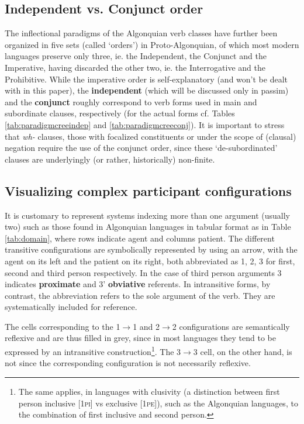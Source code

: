 \documentclass[twoside,a4paper,11pt]{article}
\newcommand{\Σ}{\greek{Σ}}
\newcommand{\pli}{\textsc{pi}}
\newcommand{\pe}{\textsc{pe}}
\begin{document}
\subsection{Independent vs. Conjunct order}
The inflectional paradigms of the Algonquian verb classes have further been organized in five sets (called `orders') in Proto-Algonquian, of which most modern languages preserve only three, ie. the Independent, the Conjunct and the Imperative, having discarded the other two, ie. the Interrogative and the Prohibitive. While the imperative order is self-explanatory (and won't be dealt with in this paper), the \textbf{independent} (which will be discussed only in passim) and the \textbf{conjunct} roughly correspond to verb forms used in main and subordinate clauses, respectively (for the actual forms cf. Tables \ref{tab:paradigmcreeindep} and \ref{tab:paradigmcreeconj}). It is important to stress that \textit{wh-} clauses, those with focalized constituents or under the scope of (clausal) negation require the use of the conjunct order, since these `de-subordinated' clauses are underlyingly (or rather, historically) non-finite.

\subsection{Visualizing complex participant configurations}
\label{subsec:visual}
It is customary to represent systems indexing more than one argument (usually two) such as those found in Algonquian languages in tabular format as in Table \ref{tab:domain}, where rows indicate agent and columns patient. The different transitive configurations are symbolically represented by using an arrow, with the agent on its left and the patient on its right, both abbreviated as 1, 2, 3 for first, second and third person respectively. In the case of third person arguments 3 indicates \textbf{proximate} and 3' \textbf{obviative} referents. In intransitive forms, by contrast, the abbreviation refers to the sole argument of the verb. They are systematically included for reference.

The cells corresponding to the 1$\rightarrow$1 and 2$\rightarrow$2 configurations are semantically reflexive and are thus filled in grey, since in most languages they tend to be expressed by an intransitive construction\footnote{The same applies, in languages with clusivity (a distinction between first person inclusive [1\pli] vs exclusive [1\pe]), such as the Algonquian languages, to the combination of first inclusive and second person.}. The 3$\rightarrow$3 cell, on the other hand, is not since the corresponding configuration is not necessarily reflexive.
\end{document}
